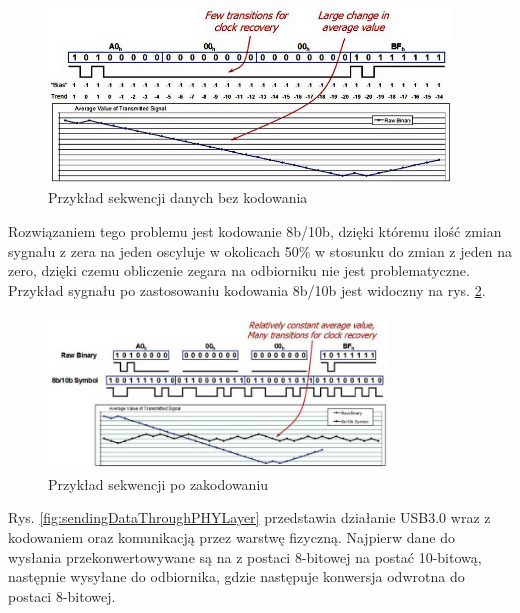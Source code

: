 \documentclass{BscUS}
\begin{document}
\begin{figure}[H]
\centering
\includegraphics[width=0.95\textwidth]{./img/withoutEncoding}
\caption{Przykład sekwencji danych bez kodowania \cite{withoutEncoding}}
\label{fig:withoutEncoding}
\end{figure}
\noindent Rozwiązaniem tego problemu jest kodowanie 8b/10b, dzięki któremu ilość zmian sygnału z zera na jeden oscyluje w okolicach 50\% w stosunku do zmian z jeden na zero, dzięki czemu obliczenie zegara na odbiorniku nie jest problematyczne. Przykład sygnału po zastosowaniu kodowania 8b/10b jest widoczny na rys. \ref{fig:withEncoding}.
\begin{figure}[H]
\centering
\includegraphics[width=0.8\textwidth]{./img/withEncoding}
\caption{Przykład sekwencji po zakodowaniu \cite{withEncoding}}
\label{fig:withEncoding}
\end{figure}
Rys. \ref{fig:sendingDataThroughPHYLayer} przedstawia działanie USB3.0 wraz z kodowaniem oraz komunikacją przez warstwę fizyczną. Najpierw dane do wysłania przekonwertowywane są na z postaci 8-bitowej na postać 10-bitową, następnie wysyłane do odbiornika, gdzie następuje konwersja odwrotna do postaci 8-bitowej.
\end{document}
